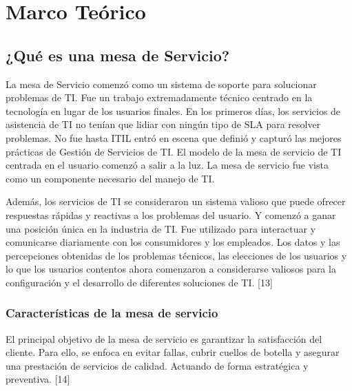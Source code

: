 

\chapter{Marco Teórico}
\section{¿Qué es una mesa de Servicio?}
La mesa de Servicio comenzó como un sistema de soporte para solucionar problemas de TI. Fue un trabajo extremadamente técnico centrado en la tecnología en lugar de los usuarios finales. En los primeros días, los servicios de asistencia de TI no tenían que lidiar con ningún tipo de SLA para resolver problemas. No fue hasta ITIL entró en escena que definió y capturó las mejores prácticas de Gestión de Servicios de TI. El modelo de la mesa de servicio de TI centrada en el usuario comenzó a salir a la luz. La mesa de servicio fue vista como un componente necesario del manejo de TI.

Además, los servicios de TI se consideraron un sistema valioso que puede ofrecer respuestas rápidas y reactivas a los problemas del usuario. Y comenzó a ganar una posición única en la industria de TI. Fue utilizado para interactuar y comunicarse diariamente con los consumidores y los empleados. Los datos y las percepciones obtenidas de los problemas técnicos, las elecciones de los usuarios y lo que los usuarios contentos ahora comenzaron a considerarse valiosos para la configuración y el desarrollo de diferentes soluciones de TI. [13]
\subsection{Características de la mesa de servicio}

El principal objetivo de la mesa de servicio es garantizar la satisfacción del cliente. Para ello, se enfoca en evitar fallas, cubrir cuellos de botella y asegurar una prestación de servicios de calidad. Actuando de forma estratégica y preventiva. [14]


